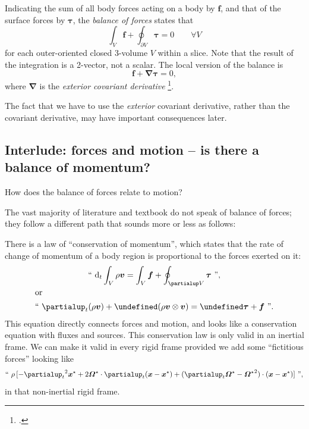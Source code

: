 \documentclass[\ifafour a4paper,12pt,\else a5paper,10pt,\fi%
onecolumn,oneside,article,%
british%
]{memoir}
\theoremstyle{remark}
\theoremstyle{innote}
\newcommand*{\citep}{\footcites}
\newcommand*{\de}{\partialup}%
\newcommand*{\di}{\mathrm{d}}%
\renewcommand*{\|}[1][]{\nonscript\,#1\vert\nonscript\;\mathopen{}}
\newcommand*{\sect}{\S}%
\let\div\undefined
\DeclareMathOperator{\div}{div}
\newcommand*{\yTT}{\tau}
\newcommand*{\yT}{\bm{\yTT}}
\newcommand*{\ybb}{f}
\newcommand*{\yb}{\bm{\ybb}}
\newcommand*{\yxxt}{x}
\newcommand*{\yxt}{\bm{\yxxt}}
\newcommand*{\yxto}{\bm{\yxxt}^{\mathord{\star}}}
\newcommand*{\yvvt}{v}
\newcommand*{\yvt}{\bm{\yvvt}}
\newcommand*{\yomm}{\varOmega}
\newcommand*{\yom}{\bm{\yomm}^{\mathord{\star}}}
\newcommand*{\yDi}{\bm{\nabla}}
\newcommand*{\yvo}{V}
\begin{document}
Indicating the sum of all body forces acting on a body by $\yb$, and that
of the surface forces by $\yT$, the \emph{balance of forces} states that
\begin{equation}
  \label{eq:force_balance_integral}
  \int_{\yvo} \yb + \oint_{\de\yvo} \yT = 0 \qquad\forall \yvo
\end{equation}
for each outer-oriented closed 3-volume $\yvo$ within a slice. Note that the
result of the integration is a 2-vector, not a scalar. The local version of
the balance is
\begin{equation}
  \label{eq:force_balance_ecd_local}
  \yb + \yDi \yT = 0, 
\end{equation}
where $\yDi$ is the \emph{exterior covariant derivative}
\citep[\sect~Vbis.A.4]{choquetbruhatetal1977_r1996}[\sect~14.5]{misneretal1970_r1973}[\sect~9.3]{frankel1997_r2012}[see
also][]{segev2000,segev2000b,segevetal2000,segev2002,segevetal2012,kansoetal2007}.

The fact that we have to use the \emph{exterior} covariant derivative, rather than
the covariant derivative, may have important consequences later.

\subsection{Interlude: forces and motion -- is there a balance of
  momentum?}
\label{sec:really_balance_momentum}

How does the balance of forces relate to motion?

The vast majority of literature and textbook do not speak of balance of
forces; they follow a different path that sounds more or less as follows:

There is a law of \enquote{conservation of momentum}, which states that the
rate of change of momentum of a body region is proportional to the forces
exerted on it:
\begin{subequations}\label{eq:conservation_momentum_traditional}
  \begin{gather}
    \label{eq:conservation_momentum_traditional_integral}
    \text{\textquotedblleft}\ 
    \di_t\int_{\yvo}\rho\yvt = \int_{\yvo} \yb + \oint_{\de\yvo} \yT
    \ \text{\textquotedblright},
    \\\shortintertext{or}
    \label{eq:conservation_momentum_traditional_differential}
    \text{\textquotedblleft}\ 
    \de_t(\rho\yvt) + \div(\rho\yvt\otimes\yvt) = \div\yT +\yb
    \ \text{\textquotedblright}.
  \end{gather}
\end{subequations}
This equation directly connects forces and motion, and looks like a
conservation equation with fluxes and sources. This conservation law is
only valid in an inertial frame. We can make it valid in every rigid frame
provided we add some \enquote{fictitious forces} looking like
\begin{equation}
  \label{eq:fictitious_forces}
    \text{\textquotedblleft}\ 
  \rho\, [-{\de_t}^2\yxto%
  + 2\yom\cdot\de_t(\yxt-\yxto) + (\de_t\yom-{\yom}^2)\cdot(\yxt-\yxto)]
    \ \text{\textquotedblright},
\end{equation}
in that non-inertial rigid frame.
\end{document}
